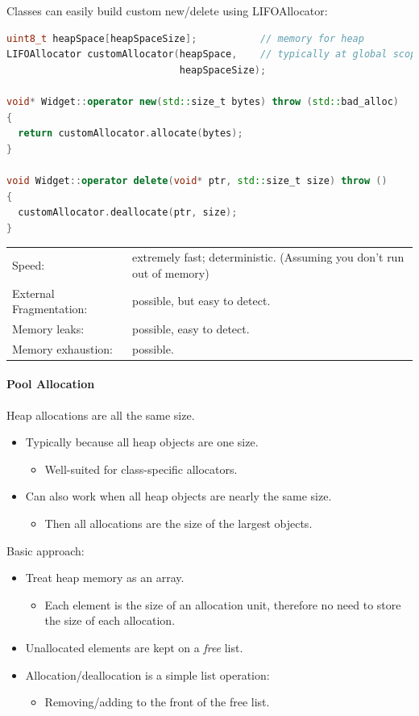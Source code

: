 Classes can easily build custom new/delete using LIFOAllocator:
\begin{lstlisting}[language=C++]
uint8_t heapSpace[heapSpaceSize];           // memory for heap
LIFOAllocator customAllocator(heapSpace,    // typically at global scope
                              heapSpaceSize);

void* Widget::operator new(std::size_t bytes) throw (std::bad_alloc)
{
  return customAllocator.allocate(bytes);
}

void Widget::operator delete(void* ptr, std::size_t size) throw ()
{
  customAllocator.deallocate(ptr, size);
}
\end{lstlisting}

\begin{tabular}{|l|p{7cm}|}
  \hline
  Speed: & extremely fast; deterministic. (Assuming you don't run out of memory)\\
  External Fragmentation: & possible, but easy to detect.\\
  Memory leaks: & possible, easy to detect.\\
  Memory exhaustion: & possible.\\
  \hline
\end{tabular}

\paragraph{Pool Allocation}
Heap allocations are all the same size.
\begin{itemize}
  \item Typically because all heap objects are one size.
  \begin{itemize}
    \item Well-suited for class-specific allocators.
  \end{itemize}
  \item Can also work when all heap objects are nearly the same size.
  \begin{itemize}
    \item Then all allocations are the size of the largest objects.
  \end{itemize}
\end{itemize}

Basic approach:
\begin{itemize}
  \item Treat heap memory as an array.
  \begin{itemize}
    \item Each element is the size of an allocation unit, therefore no need to store the size of each allocation.
  \end{itemize}
  \item Unallocated elements are kept on a \textit{free} list.
  \item Allocation/deallocation is a simple list operation:
  \begin{itemize}
    \item Removing/adding to the front of the free list.
  \end{itemize}
\end{itemize}

